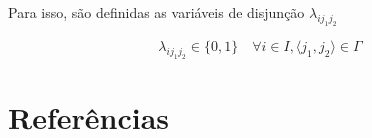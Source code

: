 \documentclass[]{article}
\newif\ifartigo
\begin{document}
 			Para isso, são definidas as variáveis de disjunção $\lambda_{ij_1j_2}$
 			
 			\begin{equation}
 				\label{cflp:ms:ci:dom:var}		
 				\lambda_{ij_1j_2} \in \{ 0, 1 \}	
 				\quad
 				\forall i \in I, \langle j_1, j_2 \rangle \in \Gamma	
 			\end{equation}
\fi

\ifartigo		 
	\section{Experimentos computacionais}
	
		
			
			
			
			
			
		
		
\fi		

	\section{Referências}
		
\end{document}
